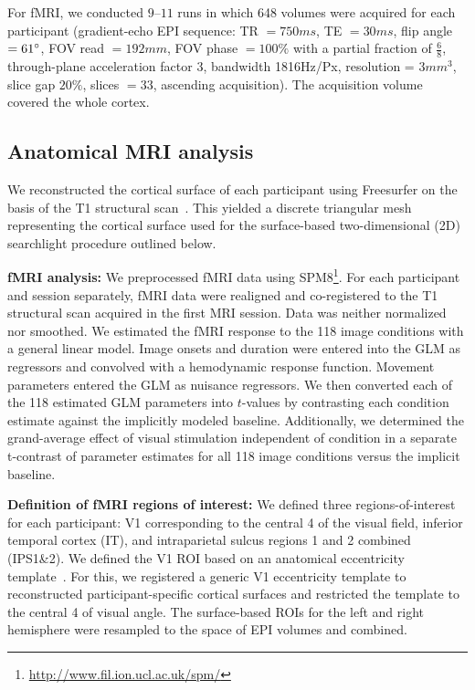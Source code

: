 \documentclass[10pt,twocolumn,letterpaper]{article}
\begin{document}
For fMRI, we conducted $9–11$ runs in which 648 volumes were acquired for each participant (gradient-echo EPI sequence: TR $= 750 ms$, TE $= 30 ms$, flip angle $= 61\degree$, FOV read $= 192 mm$, FOV phase $= 100\%$ with a partial fraction of $\frac{6}{8}$, through-plane acceleration factor 3, bandwidth 1816Hz/Px, resolution = $3mm^3$, slice gap $20\%$, slices $= 33$, ascending acquisition). The acquisition volume covered the whole cortex.

\subsection{Anatomical MRI analysis}
We reconstructed the cortical surface of each participant using Freesurfer on the basis of the T1 structural scan~\cite{dale1999cortical}. This yielded a discrete triangular mesh representing the cortical surface used for the surface-based two-dimensional (2D) searchlight procedure outlined below.

\textbf{fMRI analysis:}
We preprocessed fMRI data using SPM8\footnote{\href{http://www.fil.ion.ucl.ac.uk/spm/}{http://www.fil.ion.ucl.ac.uk/spm/}}. For each participant and session separately, fMRI data were realigned and co-registered to the T1 structural scan acquired in the first MRI session. Data was neither normalized nor smoothed. We estimated the fMRI response to the 118 image conditions with a general linear model. Image onsets and duration were entered into the GLM as regressors and convolved with a hemodynamic response function. Movement parameters entered the GLM as nuisance regressors. We then converted each of the 118 estimated GLM parameters into $t$-values by contrasting each condition estimate against the implicitly modeled baseline. Additionally, we determined the grand-average effect of visual stimulation independent of condition in a separate t-contrast of parameter estimates for all 118 image conditions versus the implicit baseline.

\textbf{Definition of fMRI regions of interest:}
We defined three regions-of-interest for each participant: V1 corresponding to the central 4 of the visual field, inferior temporal cortex (IT), and intraparietal sulcus regions 1 and 2 combined (IPS1\&2). We defined the V1 ROI based on an anatomical eccentricity template~\cite{benson2012retinotopic}. For this, we registered a generic V1 eccentricity template to reconstructed participant-specific cortical surfaces and restricted the template to the central 4 of visual angle. The surface-based ROIs for the left and right hemisphere were resampled to the space of EPI volumes and combined.
\end{document}

